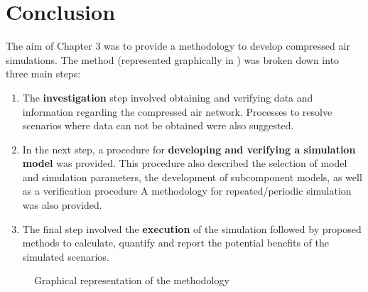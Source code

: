 \section{Conclusion}
The aim of Chapter 3 was to provide a methodology to develop compressed air simulations. The method (represented graphically in ) was broken down into three main steps:
\begin{enumerate}
	\item The \textbf{investigation} step involved obtaining and verifying data and information regarding the compressed air network. Processes to resolve scenarios where data can not be obtained were also suggested.
	\item In the next step, a procedure for \textbf{developing and verifying a simulation model} was provided. This procedure also described the selection of model and simulation parameters, the development of subcomponent models, as well as a verification procedure A methodology for repeated/periodic simulation was also provided.
	\item The final step involved the \textbf{execution} of the simulation followed by proposed methods to calculate, quantify and report the potential benefits of the simulated scenarios.
\end{enumerate}
\begin{figure}[h]
	\centering
	\caption{Graphical representation of the methodology}
	\label{fig: flow diagram}
\end{figure}
